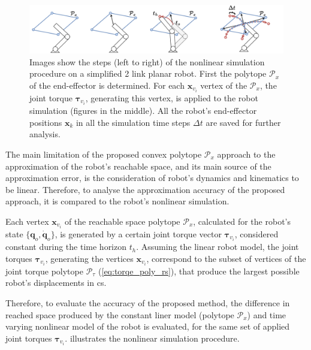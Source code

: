 \begin{figure}[!h]
    \centering
    \includegraphics[width=\linewidth]{Papers/images/simulation.pdf}
    \caption{Images show the steps (left to right) of the nonlinear simulation procedure on a simplified 2 link planar robot. First the polytope $\mathcal{P}_x$ of the end-effector is determined. For each $\bm{x}_{v_i}$ vertex of the $\mathcal{P}_x$, the joint torque $\bm{\tau}_{v_i}$, generating this vertex, is applied to the robot simulation (figures in the middle). All the robot's end-effector positions $\bm{x}_k$ in all the simulation time steps $\Delta t$ are saved for further analysis.}
    \label{fig:simulation}   
\end{figure}
The main limitation of the proposed convex polytope $\mathcal{P}_x$ approach to the approximation of the robot's reachable space, and its main source of the approximation error, is the consideration of  robot's dynamics and kinematics to be linear.
Therefore, to analyse the approximation accuracy of the proposed approach, it is compared to the robot's nonlinear simulation.

Each vertex $\bm{x}_{v_i}$ of the reachable space polytope $\mathcal{P}_x$, calculated for the robot's state $\{\bm{q}_o,\dot{\bm{q}}_o\}$, is generated by a certain joint torque vector $\bm{\tau}_{v_i}$, considered constant during the time horizon $t_h$.
Assuming the linear robot model, the joint torques $\bm{\tau}_{v_i}$, generating the vertices $\bm{x}_{v_i}$, correspond to the subset of vertices of the joint torque polytope $\mathcal{P}_\tau$ (\ref{eq:torqe_poly_rs}), that produce the largest possible robot's displacements in \gls{cs}.

Therefore, to evaluate the accuracy of the proposed method, the difference in reached space produced by the constant liner model (polytope $\mathcal{P}_x$) and time varying nonlinear model of the robot is evaluated, for the same set of applied joint torques $\bm{\tau}_{v_i}$.  illustrates the nonlinear simulation procedure.


